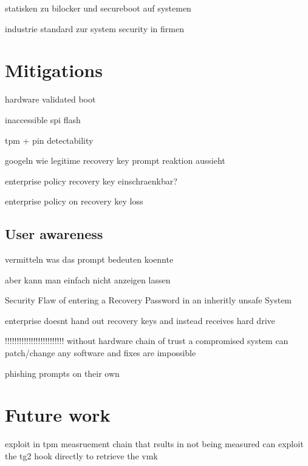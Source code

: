 statisken zu bilocker und secureboot auf systemen

industrie standard zur system security in firmen

\section{Mitigations}

hardware validated boot

inaccessible spi flash

tpm + pin detectability

googeln wie legitime recovery key prompt reaktion aussieht

enterprise policy recovery key einschraenkbar?

enterprise policy on recovery key loss


\subsection{User awareness}

vermitteln was das prompt bedeuten koennte

aber kann man einfach nicht anzeigen lassen

Security Flaw of entering a Recovery Password in an inheritly unsafe System

enterprise doesnt hand out recovery keys and instead receives hard drive


!!!!!!!!!!!!!!!!!!!!!!!!!
without hardware chain of trust a compromised system can patch/change any software and fixes are impossible

phishing prompts on their own

\section{Future work}
exploit in tpm measruement chain that rsults in not being measured
can exploit the tg2 hook directly to retrieve the vmk